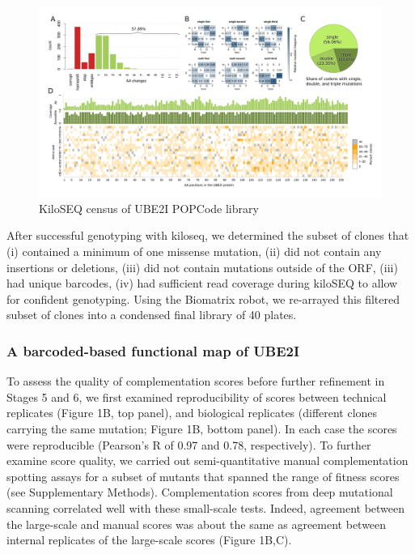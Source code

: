 \begin{figure}[h!]
	\centering
	\includegraphics[width=\textwidth]{img/popcode_census.pdf}
	\caption{KiloSEQ census of UBE2I POPCode library}
	\label{fig:popcode_census}
\end{figure}


After successful genotyping with kiloseq, we determined the subset of clones that (i) contained a minimum of one missense mutation, (ii) did not contain any insertions or deletions, (iii) did not contain mutations outside of the ORF, (iii) had unique barcodes, (iv) had sufficient read coverage during kiloSEQ to allow for confident genotyping. Using the Biomatrix robot, we re-arrayed this filtered subset of clones into a condensed final library of 40 plates.


\subsubsection{A barcoded-based functional map of UBE2I}

To assess the quality of complementation scores before further refinement in Stages 5 and 6, we first examined reproducibility of scores between technical replicates (Figure 1B, top panel), and biological replicates (different clones carrying the same mutation; Figure 1B, bottom panel).  In each case the scores were reproducible (Pearson’s R of 0.97 and 0.78, respectively).   To further examine score quality, we carried out semi-quantitative manual complementation spotting assays for a subset of mutants that spanned the range of fitness scores (see Supplementary Methods). Complementation scores from deep mutational scanning correlated well with these small-scale tests. Indeed, agreement between the large-scale and manual scores was about the same as agreement between internal replicates of the large-scale scores (Figure 1B,C). 

